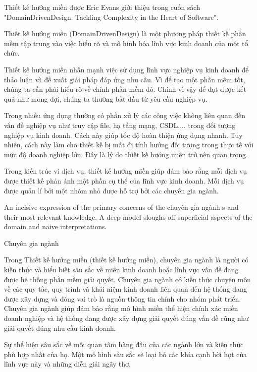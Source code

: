 Thiết kế hướng miền được Eric Evans giới thiệu trong cuốn sách "DomainDrivenDesign: Tackling Complexity in the Heart of Software".

Thiết kế hướng miền (DomainDrivenDesign) là một phương pháp thiết kế phần mềm tập trung vào việc hiểu rõ và mô hình hóa lĩnh vực kinh doanh của một tổ chức.

Thiết kế hướng miền nhấn mạnh việc sử dụng lĩnh vực nghiệp vụ kinh doanh để thảo luận và đề xuất giải pháp đáp ứng nhu cầu. Vì để tạo một phần mềm tốt, chúng ta cần phải hiểu rõ về chính phần mềm đó. Chính vì vậy để đạt được kết quả như mong đợi, chúng ta thường bắt đầu từ yêu cầu nghiệp vụ.

Trong nhiều ứng dụng thường có phần xử lý các công việc không liên quan đến vấn đề nghiệp vụ như truy cập file, hạ tầng mạng, CSDL,... trong đối tượng nghiệp vụ kinh doanh. Cách này giúp tốc độ hoàn thiện ứng dụng nhanh. Tuy nhiên, cách này làm cho thiết kế bị mất đi tính hướng đối tượng trong thực tế với mức độ doanh nghiệp lớn. Đây là lý do thiết kế hướng miền trở nên quan trọng.

Trong kiến trúc vi dịch vụ, thiết kế hướng miền giúp đảm bảo rằng mỗi dịch vụ được thiết kế phản ánh một phần cụ thể của lĩnh vực kinh doanh. Mỗi dịch vụ được quản lí bởi một nhóm nhỏ được hỗ trợ bởi các chuyên gia ngành.



An incisive expression of the primary concerns of the chuyên gia ngành s and their most relevant knowledge. A deep model sloughs off superficial aspects of the domain and naive interpretations.

 

Chuyên gia ngành

Trong Thiết kế hướng miền (thiết kế hướng miền), chuyên gia ngành là người có kiến thức và hiểu biết sâu sắc về miền kinh doanh hoặc lĩnh vực vấn đề đang được hệ thống phần mềm giải quyết. Chuyên gia ngành có kiến thức chuyên môn về các quy tắc, quy trình và khái niệm kinh doanh liên quan đến hệ thống đang được xây dựng và đóng vai trò là nguồn thông tin chính cho nhóm phát triển. Chuyên gia ngành giúp đảm bảo rằng mô hình miền thể hiện chính xác miền doanh nghiệp và hệ thống đang được xây dựng giải quyết đúng vấn đề cũng như giải quyết đúng nhu cầu kinh doanh.

Sự thể hiện sâu sắc về mối quan tâm hàng đầu của các ngành lớn và kiến thức phù hợp nhất của họ. Một mô hình sâu sắc sẽ loại bỏ các khía cạnh hời hợt của lĩnh vực này và những diễn giải ngây thơ.

